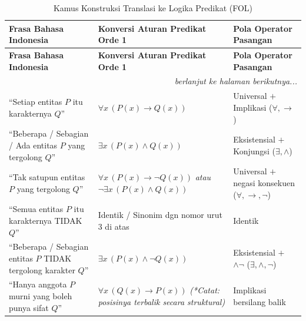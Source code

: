 \renewcommand{\arraystretch}{1.5}
\begin{longtable}{|p{4cm}|p{6cm}|p{4.5cm}|}
\caption{Kamus Konstruksi Translasi ke Logika Predikat (FOL)} \label{tab:translasi_fol} \\
\hline
\textbf{Frasa Bahasa Indonesia} & \textbf{Konversi Aturan Predikat Orde 1} & \textbf{Pola Operator Pasangan} \\ \hline
\endfirsthead

\hline
\textbf{Frasa Bahasa Indonesia} & \textbf{Konversi Aturan Predikat Orde 1} & \textbf{Pola Operator Pasangan} \\ \hline
\endhead

\multicolumn{3}{r}{\textit{berlanjut ke halaman berikutnya...}} \\
\endfoot

\hline
\endlastfoot

``Setiap entitas $P$ itu karakternya $Q$'' & $\forall x \, (P(x) \rightarrow Q(x))$ & Universal $+$ Implikasi \newline ($\forall, \rightarrow$) \\ \hline

``Beberapa / Sebagian / Ada entitas $P$ yang tergolong $Q$'' & $\exists x \, (P(x) \land Q(x))$ & Eksistensial $+$ Konjungsi \newline ($\exists, \land$) \\ \hline

``Tak satupun entitas $P$ yang tergolong $Q$'' & $\forall x \, (P(x) \rightarrow \neg Q(x))$ \newline \textit{atau} \newline $\neg \exists x \, (P(x) \land Q(x))$ & Universal $+$ negasi konsekuen \newline ($\forall, \rightarrow, \neg$) \\ \hline

``Semua entitas $P$ itu karakternya TIDAK $Q$'' & Identik / Sinonim dgn nomor urut 3 di atas & Identik \\ \hline

``Beberapa / Sebagian entitas $P$ TIDAK tergolong karakter $Q$'' & $\exists x \, (P(x) \land \neg Q(x))$ & Eksistensial $+$ $\land\neg$ \newline ($\exists, \land, \neg$) \\ \hline

``Hanya anggota $P$ murni yang boleh punya sifat $Q$'' & $\forall x \, (Q(x) \rightarrow P(x))$ \newline \textit{(*Catat: posisinya terbalik secara struktural)} & Implikasi bersilang balik \\ \hline

\end{longtable}

